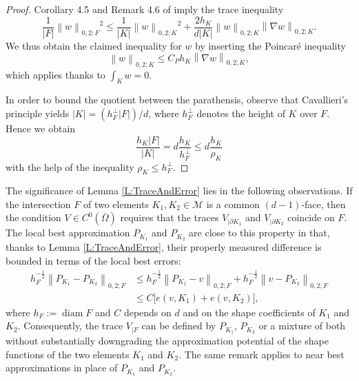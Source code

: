 \documentclass[a4paper]{amsart}
\numberwithin{equation}{section}
\theoremstyle{plain}
\theoremstyle{definition}
\begin{document}
\begin{proof}
Corollary 4.5 and Remark 4.6 of \cite{Veeser.Verfuerth:09} imply the
trace inequality
\begin{equation*}
 \frac1{{\left|{F}\right|}} {{\left\|{{w}}\right\|_{{0,2;{F}}}}}^2
 \leq
 \frac1{{\left|{K}\right|}} {{\left\|{{w}}\right\|_{{0,2;{K}}}}}^2
 +
 \frac{2h_{K}}{d{\left|{K}\right|}} {{\left\|{{w}}\right\|_{{0,2;{K}}}}}
  {{\left\|{{{\nabla} w}}\right\|_{{0,2;{K}}}}}.
\end{equation*}
We thus obtain the claimed inequality for $w$ by inserting the Poincar\'e 
inequality
\begin{equation*}
 {{\left\|{{w}}\right\|_{{0,2;{K}}}}}
 \leq
 C_P h_{K} {{\left\|{{{\nabla} w}}\right\|_{{0,2;{K}}}}},
\end{equation*}
which applies thanks to $\int_{K} w = 0$.

In order to bound the quotient between the parathensis, observe that 
Cavallieri's principle yields ${\left|{K}\right|} = (h^\perp_{F}{\left|{F}\right|})/d$, 
where $h^\perp_{F}$ denotes the height of ${K}$ over ${F}$.  Hence we 
obtain
\[
 \frac{h_{K} {\left|{F}\right|}}{{\left|{K}\right|}}
 =
 d\frac{h_{K}}{h^\perp_F}
 \leq
 d\frac{h_{K}}{\rho_{K}}
\]
with the help of the inequality $\rho_{K} \leq h^\perp_{F}$.
\end{proof}
The significance of Lemma \ref{L:TraceAndError} lies in the following 
observations.
If the intersection ${F}$ of two elements $K_1,K_2\in{\mathcal{M}}$ is a common 
$(d-1)$-face, then the condition $V\in C^0(\overline\Omega)$ requires that the 
traces $V_{|\partial{K}_1}$ and $V_{|\partial{K}_2}$ coincide on ${F}$.  
The local best approximation $P_{{K}_1}$ and $P_{{K}_2}$ are close to this 
property in that, thanks to Lemma \ref{L:TraceAndError}, their properly 
measured difference is bounded in terms of the local best errors:
\begin{align*}
 h_{F}^{-\frac12} {{\left\|{{P_{{K}_1}-P_{{K}_2}}}\right\|_{{0,2;{F}}}}}
 &\leq
 h_{F}^{-\frac12} {{\left\|{{P_{{K}_1}-v}}\right\|_{{0,2;{F}}}}}
  + 
  h_{F}^{-\frac12} {{\left\|{{v-P_{{K}_2}}}\right\|_{{0,2;{F}}}}}
\\
 &\leq
 C \big[ e(v,{K}_1) + e(v,{K}_2) \big],
\end{align*} 
where $h_{F}{:=}\operatorname{diam}{F}$ and $C$ depends on $d$ and on the shape 
coefficients of ${K}_1$ and ${K}_2$.  Consequently, the trace $V_{|{F}}$ 
can be defined by $P_{K_1}$, $P_{K_2}$ or a mixture of both without 
substantially downgrading the approximation potential of the shape functions of 
the two elements ${K}_1$ and ${K}_2$.  The same remark applies to near best 
approximations in place of $P_{K_1}$ and $P_{K_2}$.
\end{document}
